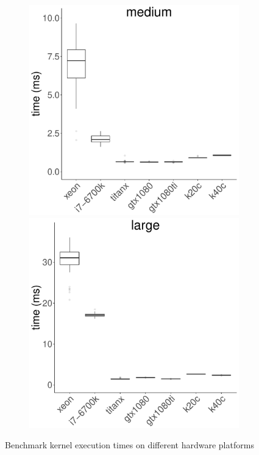 \documentclass[../document.tex]{subfiles}
\begin{document}
\begin{figure}
\begin{subfigure}{0.9\textwidth}
		\includegraphics[width=\plotwidth]{figures/time-results/generate_fft_medium_boxplot-1}
		\includegraphics[width=\plotwidth]{figures/time-results/generate_fft_large_boxplot-1}
	\end{subfigure}
    \caption{Benchmark kernel execution times on different hardware platforms}\label{fig:time}
\end{figure}
\end{document}
